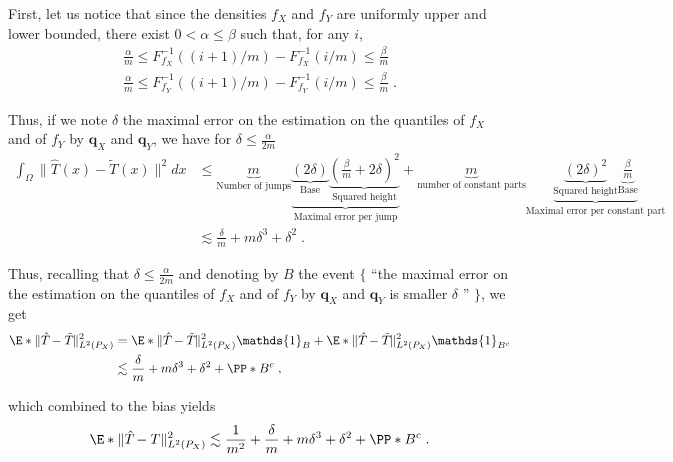 \documentclass{article}
\newcommand{\1}{\mathds{1}}
\theoremstyle{plain}
\theoremstyle{definition}
\theoremstyle{remark}
\begin{document}
First, let us notice that since the densities $f_X$ and $f_Y$ are uniformly upper and lower bounded, there exist $0 < \alpha \leq \beta$ such that, for any $i$,
\begin{align}
        \frac{\alpha}{m} \leq F_{f_X}^{-1}((i+1)/m) - F_{f_X}^{-1}(i/m) \leq \frac{\beta}{m} \\
            \frac{\alpha}{m} \leq F_{f_Y}^{-1}((i+1)/m) - F_{f_Y}^{-1}(i/m) \leq \frac{\beta}{m} \;.
\end{align}


Thus, if we note $\delta$ the maximal error on the estimation on the quantiles of $f_X$ and of $f_Y$ by $\mathbf{q}_X$ and $\mathbf{q}_Y$, we have for $\delta \leq \frac{\alpha}{2m}$
\begin{equation}
    \begin{aligned}
        \int_{\Omega}\| \hat{T}_{}(x) - \tilde{T}_{}(x)\|^2 dx
        &\leq 
        \underbrace{m}_{\text{Number of jumps}} \underbrace{ \underbrace{({2} \delta)}_{\text{Base}} \underbrace{(\frac{\beta}{m} + 2 \delta)^2}_{\text{Squared height}}}_{\text{Maximal error per jump}} + \underbrace{m}_{\text{number of constant parts}} \underbrace{\underbrace{({2} \delta)^2}_{\text{Squared height}} \underbrace{\frac{\beta}{m}}_{\text{Base}}}_{\text{Maximal error per constant part}} \\
        &\lesssim \frac{\delta}{m} + m \delta^3 + \delta^2 \;.
    \end{aligned}
\end{equation}


Thus, recalling that $\delta \leq \frac{\alpha}{2m}$ and denoting by $B$ the event $\bigl\{$ ``the maximal error on the estimation on the quantiles of $f_X$ and of $f_Y$ by $\mathbf{q}_X$ and $\mathbf{q}_Y$ is smaller $\delta$ ''  $\bigr\}$, we get 
\begin{equation}
    \begin{aligned}
        \E*{\| \hat{T}_{} - \tilde{T}_{}\|^2_{L^2(P_X)}} 
        &=
        \E*{\| \hat{T}_{} - \tilde{T}_{}\|^2_{L^2(P_X)} \1_B} +  \E*{\| \hat{T}_{} - \tilde{T}_{}\|^2_{L^2(P_X)} \1_{B^c}} \\
        &\lesssim \frac{\delta}{m} + m \delta^3 + \delta^2 + \PP*{B^c} \;,
    \end{aligned}
\end{equation}

which combined to the bias yields
\begin{equation}
\label{eq:kljnkjhbkjazf}
    \E*{\| \hat{T}_{} - T \|^2_{L^2(P_X)}}
    \lesssim
    \frac{1}{m^2} + \frac{\delta}{m} + m \delta^3 + \delta^2 + \PP*{B^c} \;.
\end{equation}
\end{document}
